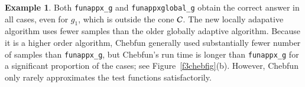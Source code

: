 \documentclass[review]{elsarticle}
\theoremstyle{definition}
\newtheorem{exmp}{Example}
\newcommand{\funappxg}{\texttt{funappx\_g}\xspace}
\newcommand{\funappxglobalg}{\texttt{funappxglobal\_g}\xspace}
\newcommand{\funming}{\texttt{funmin\_g}\xspace}
\newcommand{\fminbnd}{\texttt{fminbnd}\xspace}
\begin{document}
\begin{exmp}
Both \funappxg{} and \funappxglobalg{} obtain the correct answer in all cases,
even for $g_1$, which is outside the cone $\mathcal{C}$. The new locally adapative
algorithm uses fewer samples than the older globally adaptive algorithm. Because it is a higher order algorithm, Chebfun generally used substantially fewer number of samples than
\funappxg, but Chebfun's run time is longer than \funappxg for a
significant proportion of the cases; see Figure~\ref{f3chebfig}(b). However, Chebfun only rarely
approximates the test functions satisfactorily.

\end{exmp}
\end{document}
